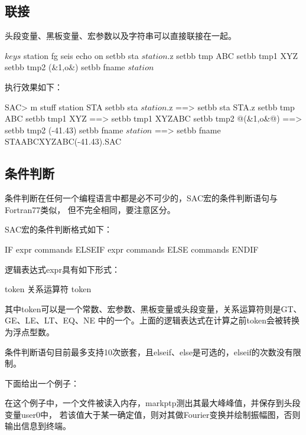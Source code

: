 \subsection{联接}
头段变量、黑板变量、宏参数以及字符串可以直接联接在一起。

\begin{SACCode}
$keys$ station                                                                   
fg seis                                                                          
echo on                                                                          
setbb sta $station$.z                                                            
setbb tmp ABC                                                                    
setbb tmp1 XYZ%
setbb tmp2 (&1,o&)                                                               
setbb fname $station$%
\end{SACCode}

执行效果如下：
\begin{SACCode}
SAC> m stuff station STA
 setbb sta $station$.z
 ==>  setbb sta STA.z
 setbb tmp ABC
 setbb tmp1 XYZ%
 ==>  setbb tmp1 XYZABC
 setbb tmp2 @(&1,o&@)
 ==>  setbb tmp2 (-41.43)
 setbb fname $station$%
 ==>  setbb fname STAABCXYZABC(-41.43).SAC
\end{SACCode}

\subsection{条件判断}
条件判断在任何一个编程语言中都是必不可少的，SAC宏的条件判断语句与Fortran77类似，
但不完全相同，要注意区分。

SAC宏的条件判断格式如下：
\begin{SACCode}
  IF expr
  	commands
  ELSEIF expr
  	commands
  ELSE
  	commands
  ENDIF
\end{SACCode}

逻辑表达式expr具有如下形式：
\begin{SACCode}
    token 关系运算符 token
\end{SACCode}
其中token可以是一个常数、宏参数、黑板变量或头段变量，关系运算符则是GT、GE、LE、LT、EQ、NE
中的一个。上面的逻辑表达式在计算之前token会被转换为浮点型数。

条件判断语句目前最多支持10次嵌套，且elseif、else是可选的，elseif的次数没有限制。

下面给出一个例子：
在这个例子中，一个文件被读入内存，markptp测出其最大峰峰值，并保存到头段变量user0中，
若该值大于某一确定值，则对其做Fourier变换并绘制振幅图，否则输出信息到终端。

